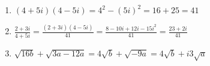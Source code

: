 {\color{solution}
\begin{enumerate}
	\item $(4+5i)(4-5i) = 4^2-(5i)^2 = 16+25 = 41$
	\item $\frac{2+3i}{4+5i} = \frac{(2+3i)(4-5i)}{41}=\frac{8-10i+12i-15i^2}{41} =\frac{23+2i}{41}$
	\item $\sqrt{16b}+\sqrt{3a-12a}=4\sqrt{b}+\sqrt{-9a} =4\sqrt{b}+i3\sqrt{a}$
\end{enumerate}
}